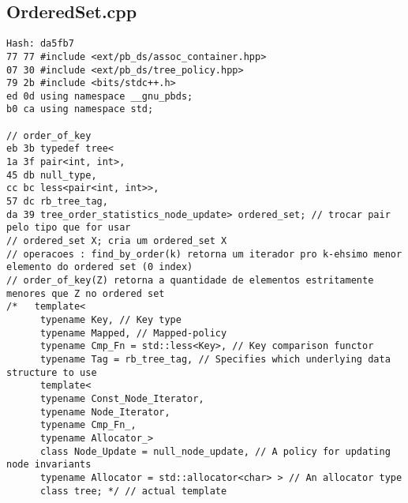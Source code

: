 \documentclass[11pt, a4paper, twoside]{article}
\begin{document}
\subsection{OrderedSet.cpp}
\begin{lstlisting}
Hash: da5fb7
77 77 #include <ext/pb_ds/assoc_container.hpp>
07 30 #include <ext/pb_ds/tree_policy.hpp>
79 2b #include <bits/stdc++.h>
ed 0d using namespace __gnu_pbds;
b0 ca using namespace std;

// order_of_key
eb 3b typedef tree<
1a 3f pair<int, int>,
45 db null_type,
cc bc less<pair<int, int>>,
57 dc rb_tree_tag,
da 39 tree_order_statistics_node_update> ordered_set; // trocar pair pelo tipo que for usar
// ordered_set X; cria um ordered_set X
// operacoes : find_by_order(k) retorna um iterador pro k-ehsimo menor elemento do ordered set (0 index)
// order_of_key(Z) retorna a quantidade de elementos estritamente menores que Z no ordered set
/*   template<
	  typename Key, // Key type
	  typename Mapped, // Mapped-policy
	  typename Cmp_Fn = std::less<Key>, // Key comparison functor
	  typename Tag = rb_tree_tag, // Specifies which underlying data structure to use
	  template<
	  typename Const_Node_Iterator,
	  typename Node_Iterator,
	  typename Cmp_Fn_,
	  typename Allocator_>
	  class Node_Update = null_node_update, // A policy for updating node invariants
	  typename Allocator = std::allocator<char> > // An allocator type
	  class tree; */ // actual template
\end{lstlisting}
\end{document}
